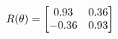 \documentclass[preview]{standalone}
\begin{document}
\begin{align*}
\special{dvisvgm:raw <g id='unique000'>}R(\theta) = \begin{bmatrix}0.93 & 0.36\\-0.36 & 0.93\end{bmatrix}\special{dvisvgm:raw </g>}
\end{align*}
\end{document}
